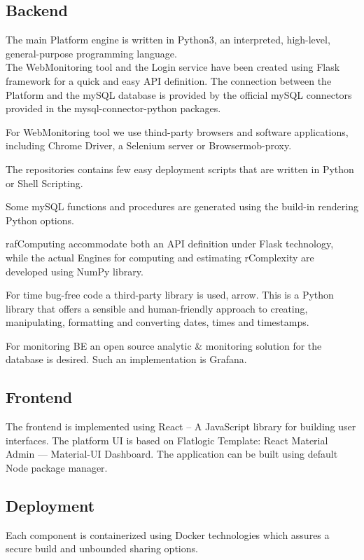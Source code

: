 \subsection{Backend}
The main Platform engine is written in Python3, an interpreted, high-level, general-purpose programming language. \\

The WebMonitoring tool and the Login service have been created using Flask framework for a quick and easy API definition. The connection between the Platform and the mySQL database is provided by the official mySQL connectors provided in the mysql-connector-python packages.

For WebMonitoring tool we use thind-party browsers and software applications, including Chrome Driver, a Selenium server or Browsermob-proxy.

The repositories contains few easy deployment scripts that are written in Python or Shell Scripting.

Some mySQL functions and procedures are generated using the build-in rendering Python options.

rafComputing accommodate both an API definition under Flask technology, while the actual Engines for computing and estimating rComplexity are developed using NumPy library.

For time bug-free code a third-party library is used, arrow. This is a Python library that offers a sensible and human-friendly approach to creating, manipulating, formatting and converting dates, times and timestamps.

For monitoring BE an open source analytic \& monitoring solution for the database is desired. Such an implementation is Grafana.

\subsection{Frontend}
The frontend is implemented using React – A JavaScript library for building user interfaces. The platform UI is based on Flatlogic Template: React Material Admin — Material-UI Dashboard. The application can be built using default Node package manager.

\subsection{Deployment}

Each component is containerized using Docker technologies which assures a secure build and unbounded sharing options.

